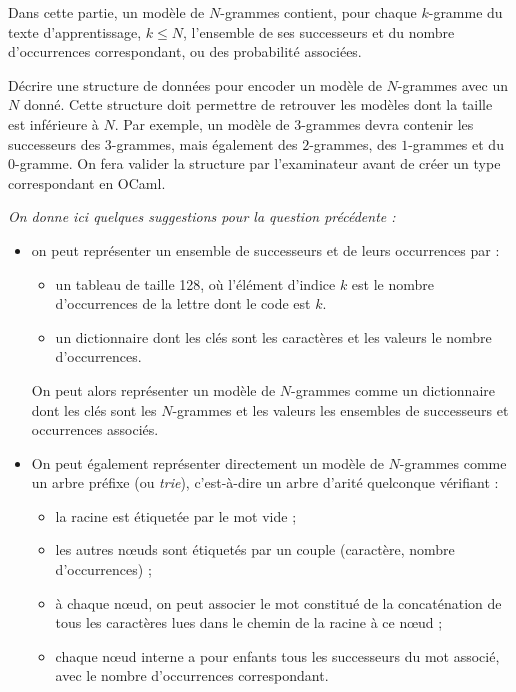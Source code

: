 \documentclass[10pt]{article}
\begin{document}
Dans cette partie, un modèle de $N$-grammes contient, pour chaque $k$-gramme du texte d'apprentissage, $k\leq N$, l'ensemble de ses successeurs et du nombre d'occurrences correspondant, ou des probabilité associées.

\begin{Exercise}
Décrire une structure de données pour encoder un modèle de $N$-grammes avec un $N$ donné. Cette structure doit permettre de retrouver les modèles dont la taille est inférieure à $N$. Par exemple, un modèle de $3$-grammes devra contenir les successeurs des $3$-grammes, mais également des $2$-grammes, des $1$-grammes et du $0$-gramme. On fera valider la structure par l'examinateur avant de créer un type correspondant en OCaml.

\textit{On donne ici quelques suggestions pour la question précédente :}
\begin{itemize}
\item on peut représenter un ensemble de successeurs et de leurs occurrences par :
\begin{itemize}
\item un tableau de taille 128, où l'élément d'indice $k$ est le nombre d'occurrences de la lettre dont le code est $k$.
\item un dictionnaire dont les clés sont les caractères et les valeurs le nombre d'occurrences.
\end{itemize}
On peut alors représenter un modèle de $N$-grammes comme un dictionnaire dont les clés sont les $N$-grammes et les valeurs les ensembles de successeurs et occurrences associés.
\item On peut également représenter directement un modèle de $N$-grammes comme un arbre préfixe (ou \textit{trie}), c'est-à-dire un arbre d'arité quelconque vérifiant :
\begin{itemize}
\item la racine est étiquetée par le mot vide ;
\item les autres nœuds sont étiquetés par un couple (caractère, nombre d'occurrences) ;
\item à chaque nœud, on peut associer le mot constitué de la concaténation de tous les caractères lues dans le chemin de la racine à ce nœud ;
\item chaque nœud interne a pour enfants tous les successeurs du mot associé, avec le nombre d'occurrences correspondant.
\end{itemize}
\end{itemize}
\end{Exercise}
\end{document}
